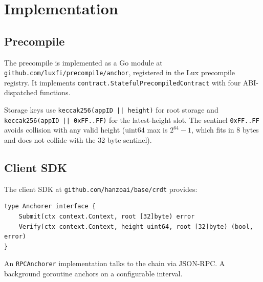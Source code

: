 \section{Implementation}

\label{sec:implementation}

\subsection{Precompile}

The precompile is implemented as a Go module at
\texttt{github.com/luxfi/precompile/anchor}, registered in the Lux
precompile registry. It implements
\texttt{contract.StatefulPrecompiledContract} with four ABI-dispatched
functions.

Storage keys use \texttt{keccak256(appID || height)} for root storage
and \texttt{keccak256(appID || 0xFF..FF)} for the latest-height slot.
The sentinel \texttt{0xFF..FF} avoids collision with any valid height
(uint64 max is $2^{64}-1$, which fits in 8 bytes and does not collide
with the 32-byte sentinel).

\subsection{Client SDK}

The client SDK at \texttt{github.com/hanzoai/base/crdt} provides:

\begin{lstlisting}
type Anchorer interface {
    Submit(ctx context.Context, root [32]byte) error
    Verify(ctx context.Context, height uint64, root [32]byte) (bool, error)
}
\end{lstlisting}

An \texttt{RPCAnchorer} implementation talks to the chain via JSON-RPC.
A background goroutine anchors on a configurable interval.

